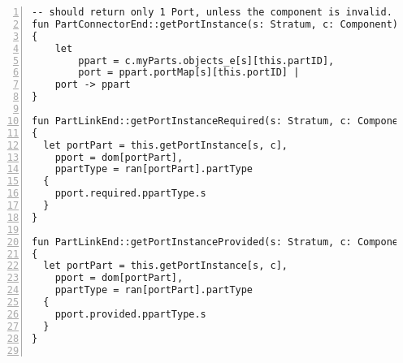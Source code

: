 \begin{lstlisting}[caption={structure.als}, numbers=left]
-- should return only 1 Port, unless the component is invalid. NOTE: the component owns the part
fun PartConnectorEnd::getPortInstance(s: Stratum, c: Component): Port -> Part
{
    let
        ppart = c.myParts.objects_e[s][this.partID],
        port = ppart.portMap[s][this.portID] |
    port -> ppart
}

fun PartLinkEnd::getPortInstanceRequired(s: Stratum, c: Component): set Interface
{
  let portPart = this.getPortInstance[s, c],
    pport = dom[portPart],
    ppartType = ran[portPart].partType
  {
    pport.required.ppartType.s
  }
}

fun PartLinkEnd::getPortInstanceProvided(s: Stratum, c: Component): set Interface
{
  let portPart = this.getPortInstance[s, c],
    pport = dom[portPart],
    ppartType = ran[portPart].partType
  {
    pport.provided.ppartType.s
  }
}


\end{lstlisting}